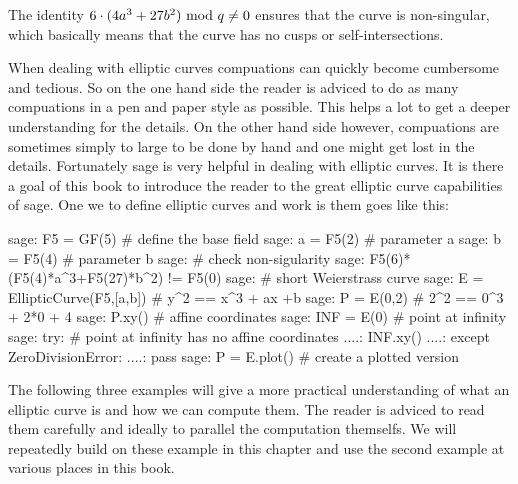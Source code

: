 The identity $6\cdot(4a^3+ 27b^2) \text{ mod } q\neq 0$ ensures that the curve is  non-singular, which basically means that the curve has no cusps or self-intersections.

When dealing with elliptic curves compuations can quickly become cumbersome and tedious. So on the one hand side the reader is adviced to do as many compuations in a pen and paper style as possible. This helps a lot to get a deeper understanding for the details. On the other hand side however, compuations are sometimes simply to large to be done by hand and one might get lost in the details. Fortunately sage is very helpful in dealing with elliptic curves. It is there a goal of this book to introduce the reader to the great elliptic curve capabilities of sage. One we to define elliptic curves and work is them goes like this:
\begin{sagecommandline}
sage: F5 = GF(5) # define the base field
sage: a = F5(2) # parameter a
sage: b = F5(4) # parameter b
sage: # check non-sigularity
sage: F5(6)*(F5(4)*a^3+F5(27)*b^2) != F5(0)
sage: # short Weierstrass curve
sage: E = EllipticCurve(F5,[a,b]) # y^2 == x^3 + ax +b
sage: P = E(0,2) # 2^2 == 0^3 + 2*0 + 4
sage: P.xy() # affine coordinates
sage: INF = E(0) # point at infinity
sage: try: 	# point at infinity has no affine coordinates
....:     INF.xy()
....: except ZeroDivisionError:
....:     pass
sage: P = E.plot() # create a plotted version
\end{sagecommandline}
The following three examples will give a more practical understanding of what an elliptic curve is and how we can compute them. The reader is adviced to read them carefully and ideally to parallel the computation themselfs. We will repeatedly build on these example in this chapter and use the second example at various places in this book.
